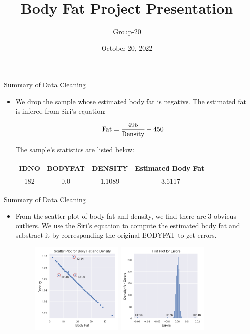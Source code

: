 \documentclass{beamer}
\begin{document}
\title{Body Fat Project Presentation}
\author{Group-20}
\date{October 20, 2022}
\frame{\titlepage}


\begin{frame}{Summary of Data Cleaning}

\begin{itemize}
\item We drop the sample whose estimated body fat is negative. The estimated fat is infered from Siri's equation:

$$
\rm Fat=\frac{495}{Density} - 450
$$

The sample's statistics are listed below:
\newline

\begin{tabular}{cccccc}
   \toprule
   IDNO & BODYFAT & DENSITY & Estimated Body Fat\\
   \midrule
   182 & 0.0 & 1.1089 & -3.6117 \\
   \bottomrule
\end{tabular}
\end{itemize}
\end{frame}


\begin{frame}{Summary of Data Cleaning}

\begin{itemize}
\item From the scatter plot of body fat and density, we find there are 3 obvious outliers. We use the Siri's equation to compute the estimated body fat and substract it by corresponding the original BODYFAT to get errors.

\begin{figure}
   \includegraphics[width=0.425\textwidth]{../image/scatter_plot_for_density_and_fat.png}
   \hfill
   \includegraphics[width=0.425\textwidth]{../image/hist_plot_for_errors.png}
\end{figure}
\end{itemize}

\end{frame}
\end{document}
